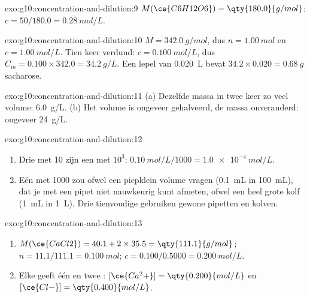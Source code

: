 \begin{solution}{exo:g10:concentration-and-dilution:9}
$M(\ce{C6H12O6}) = \qty{180.0}{g/mol}$; $c = 50 / 180.0 =
\qty{0.28}{mol/L}$.
\end{solution}

\begin{solution}{exo:g10:concentration-and-dilution:10}
$M = \qty{342.0}{g/mol}$, dus $n = \qty{1.00}{mol}$ en $c =
\qty{1.00}{mol/L}$. Tien keer verdund: $c = \qty{0.100}{mol/L}$, dus
$C_m = 0.100 \times 342.0 = \qty{34.2}{g/L}$. Een lepel van
\qty{0.020}{L} bevat $34.2 \times 0.020 = \qty{0.68}{g}$ sacharose.
\end{solution}

\begin{solution}{exo:g10:concentration-and-dilution:11}
(a) Dezelfde massa  in twee keer zo veel volume:
\qty{6.0}{g/L}. (b) Het volume is ongeveer gehalveerd, de massa  onveranderd: ongeveer \qty{24}{g/L}.
\end{solution}

\begin{solution}{exo:g10:concentration-and-dilution:12}
\begin{enumerate}
  \item Drie  met 10 zijn een  met $10^3$:
        $\qty{0.10}{mol/L} / 1000 = \qty{1.0e-4}{mol/L}$.
  \item Eén  met 1000 zou ofwel een piepklein volume
         vragen (\qty{0.1}{mL} in \qty{100}{mL}), dat je met
        een pipet niet nauwkeurig kunt afmeten, ofwel een heel grote kolf
        (\qty{1}{mL} in \qty{1}{L}). Drie tienvoudige 
        gebruiken gewone pipetten en kolven.
\end{enumerate}
\end{solution}

\begin{solution}{exo:g10:concentration-and-dilution:13}
\begin{enumerate}
  \item $M(\ce{CaCl2}) = 40.1 + 2 \times 35.5 = \qty{111.1}{g/mol}$;
        $n = 11.1 / 111.1 = \qty{0.100}{mol}$; $c = 0.100 / 0.5000 =
        \qty{0.200}{mol/L}$.
  \item Elke  geeft één  en twee :
        $[\ce{Ca^2+}] = \qty{0.200}{mol/L}$ en $[\ce{Cl-}] =
        \qty{0.400}{mol/L}$.
\end{enumerate}
\end{solution}

